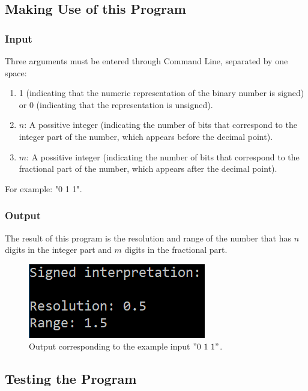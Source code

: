 \subsection{\color{purple}Making Use of this Program}
\subsubsection{\color{orange}Input}
Three arguments must be entered through Command Line, separated by one space:
\begin{enumerate}
\item  1 (indicating that the numeric representation of the binary number is signed) or 0 (indicating that the representation is unsigned).
\item $n$: A possitive integer (indicating the number of bits that correspond to the integer part of the number, which appears before the decimal point).
\item  $m$: A possitive integer (indicating the number of bits that correspond to the fractional part of the number, which appears after the decimal point).
\end{enumerate}
{\color{cyan}For example: "0 1 1"}.

\subsubsection{\color{orange}Output}
The result of this program is the resolution and range of the number that has $n$ digits in the integer part and $m$ digits in the fractional part.

\begin{figure}[h!]
\centering
\includegraphics[scale=1]{../E1TP1/ejemploOutput}
\caption{\color{cyan}Output corresponding to the example input $"0\ 1\ 1"$.}
\label{image output}
\end{figure}

\subsection{\color{purple}Testing the Program}

%




